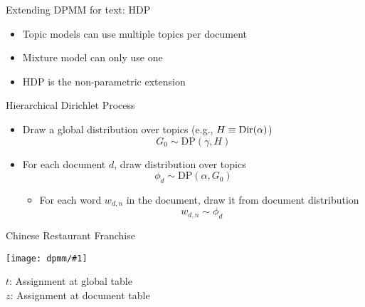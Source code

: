 \documentclass[compress]{beamer}
\newcommand{\gfx}[2]{
\begin{center}
	\texttt{[image: dpmm/\#1]}
\end{center}
}
\begin{document}
\begin{frame}{Extending DPMM for text: HDP}

\begin{itemize}
  \item Topic models can use multiple topics per document
  \item Mixture model can only use one
  \item HDP is the non-parametric extension
\end{itemize}

\end{frame}

\begin{frame}{Hierarchical Dirichlet Process}

  \begin{itemize}
    \item Draw a global distribution over topics (e.g., $H\equiv \mbox{Dir}(\alpha)$)
      \begin{equation}
        G_0 \sim \mbox{DP}(\gamma, H)
      \end{equation}
      \item For each document $d$, draw distribution over topics
        \begin{equation}
          \phi_d \sim \mbox{DP}(\alpha, G_0)
        \end{equation}
        \begin{itemize}
          \item For each word $w_{d,n}$ in the document, draw it from document
            distribution
        \begin{equation}
          w_{d,n} \sim \phi_d
        \end{equation}
        \end{itemize}
  \end{itemize}

\end{frame}


\begin{frame}{Chinese Restaurant Franchise}

  \gfx{crp-franchise}{.55}

  \begin{center}
    $t$: Assignment at global table \\
    $z$: Assignment at document table
  \end{center}

\end{frame}
\end{document}
